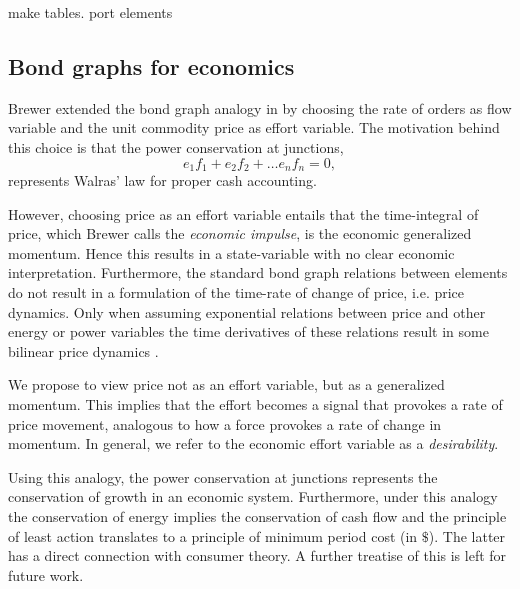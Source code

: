 \begin{tcolorbox}
make tables. port elements 
\end{tcolorbox}

\subsection{Bond graphs for economics}
Brewer extended the bond graph analogy in \cite{} by choosing the rate of orders as flow variable and the unit commodity price as effort variable.
The motivation behind this choice is that the power conservation at junctions,
\begin{equation*}
    e_1f_1+e_2f_2+\dots e_nf_n=0,
\end{equation*}
represents Walras' law for proper cash accounting.

However, choosing price as an effort variable entails that the time-integral of price, which Brewer calls the \textit{economic impulse}, is the economic generalized momentum.
Hence this results in a state-variable with no clear economic interpretation.
Furthermore, the standard bond graph relations between elements do not result in a formulation of the time-rate of change of price, i.e. price dynamics.
Only when assuming exponential relations between price and other energy or power variables the time derivatives of these relations result in some bilinear price dynamics \cite{Brewer1982}.


We propose to view price not as an effort variable, but as a generalized momentum.
This implies that the effort becomes a signal that provokes a rate of price movement, analogous to how a force provokes a rate of change in momentum.
In general, we refer to the economic effort variable as a \textit{desirability}.

Using this analogy, the power conservation at junctions represents the conservation of growth in an economic system. 
Furthermore, under this analogy the conservation of energy implies the conservation of cash flow and the principle of least action translates to a principle of minimum period cost (in $\$$).
The latter has a direct connection with consumer theory.
A further treatise of this is left for future work.










